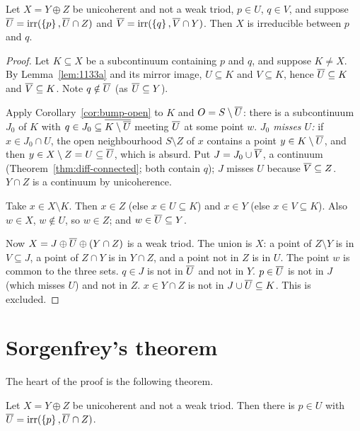 
\begin{proposition}\label{prop:1133}
Let $X=Y\oplus Z$ be unicoherent and not a weak triod, $p\in U$, $q\in V$, and suppose
$\overline{U}=\operatorname{irr}(\left\{ p \right\},\overline{U}\cap Z)$ and $\overline{V}=\operatorname{irr}(\left\{ q \right\},\overline{V}\cap Y)$. Then $X$ is irreducible between
$p$ and $q$.
\end{proposition}

\begin{proof}
Let $K\subseteq X$ be a subcontinuum containing $p$ and $q$, and suppose $K\ne X$. By
Lemma~\ref{lem:1133a} and its mirror image, $U\subseteq K$ and $V\subseteq K$, hence $\overline{U}\subseteq K$ and
$\overline{V}\subseteq K$. Note $q\notin\overline{U}$ (as $\overline{U}\subseteq Y$).

Apply Corollary~\ref{cor:bump-open} to $K$ and $O=S\setminus\overline{U}$: there is a subcontinuum $J_0$ of
$K$ with $q\in J_0\subseteq\overline{K\setminus\overline{U}}$ meeting $\overline{U}$ at some point $w$. \emph{$J_0$ misses
$U$:} if $x\in J_0\cap U$, the open neighbourhood $S\setminus Z$ of $x$ contains a point $y\in
K\setminus\overline{U}$, and then $y\in X\setminus Z=U\subseteq\overline{U}$, which is absurd. Put $J=J_0\cup\overline{V}$, a
continuum (Theorem~\ref{thm:diff-connected}; both contain $q$); $J$ misses $U$ because $\overline{V}\subseteq Z$.
$Y\cap Z$ is a continuum by unicoherence.

Take $x\in X\setminus K$. Then $x\in Z$ (else $x\in U\subseteq K$) and $x\in Y$ (else $x\in V\subseteq K$). Also
$w\in X$, $w\notin U$, so $w\in Z$; and $w\in\overline{U}\subseteq Y$.

Now $X=J\oplus\overline{U}\oplus(Y\cap Z)$ is a weak triod. The union is $X$: a point of $Z\setminus Y$ is in
$V\subseteq J$, a point of $Z\cap Y$ is in $Y\cap Z$, and a point not in $Z$ is in $U$. The point $w$ is
common to the three sets. $q\in J$ is not in $\overline{U}$ and not in $Y$. $p\in\overline{U}$ is not in $J$ (which
misses $U$) and not in $Z$. $x\in Y\cap Z$ is not in $J\cup\overline{U}\subseteq K$. This is excluded.
\end{proof}


\section{Sorgenfrey's theorem}

The heart of the proof is the following theorem.

\begin{theorem}\label{thm:irr-point}
Let $X=Y\oplus Z$ be unicoherent and not a weak triod. Then there is $p\in U$ with $\overline{U}=\operatorname{irr}(\left\{ p \right\},\overline{U}\cap Z)$.
\end{theorem}

